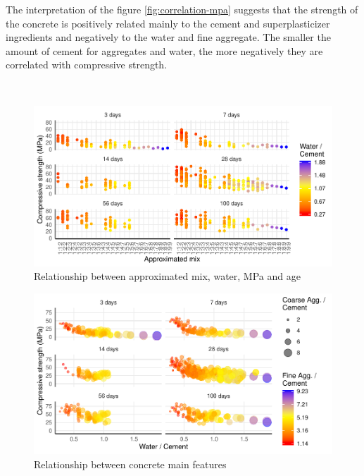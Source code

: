 \documentclass[]{article}
\begin{document}
The interpretation of the figure \ref{fig:correlation-mpa} suggests that
the strength of the concrete is positively related mainly to the cement
and superplasticizer ingredients and negatively to the water and fine
aggregate. The smaller the amount of cement for aggregates and water,
the more negatively they are correlated with compressive strength.

~

\begin{figure}

{\centering \includegraphics{CopyOfcapstone_files/figure-latex/mix-app-mpa-1} 

}

\caption{Relationship between approximated mix, water, MPa and age}\label{fig:mix-app-mpa}
\end{figure}

\begin{figure}

{\centering \includegraphics{CopyOfcapstone_files/figure-latex/mix-mpa-1} 

}

\caption{Relationship between concrete main features}\label{fig:mix-mpa}
\end{figure}
\end{document}
